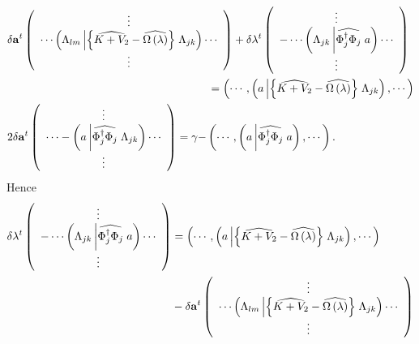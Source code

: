 \documentclass[aps,preprint]{revtex4}%
\begin{document}
\begin{align}
&  \delta\mathbf{a}^{t}\left(
\begin{array}
[c]{c}%
\vdots\\
\cdots\left(  \Lambda_{lm}\left\vert \left\{  \widehat{K+V_{2}}-\widehat
{\Omega\left(  \lambda\right)  }\right\}  \right.  \Lambda_{jk}\right)
\cdots\\
\vdots
\end{array}
\right)  +\delta\mathbf{\lambda}^{t}\left(
\begin{array}
[c]{c}%
\vdots\\
-\cdots\left(  \Lambda_{jk}\left\vert \widehat{\Phi_{j}^{\dagger}\Phi_{j}%
}\right.  a\right)  \cdots\\
\vdots
\end{array}
\right) \nonumber\\
&  \qquad\qquad\qquad\qquad\qquad\qquad\qquad\qquad\qquad\left.  =\right.
\left(  \cdots,\left(  a\left\vert \left\{  \widehat{K+V_{2}}-\widehat
{\Omega\left(  \lambda\right)  }\right\}  \right.  \Lambda_{jk}\right)
,\cdots\right) \nonumber\\
&  2\delta\mathbf{a}^{t}\left(
\begin{array}
[c]{c}%
\vdots\\
\cdots-\left(  a\left\vert \widehat{\Phi_{j}^{\dagger}\Phi_{j}}\right.
\Lambda_{jk}\right)  \cdots\\
\vdots
\end{array}
\right)  =\mathbf{\gamma-}\left(  \cdots,\left(  a\left\vert \widehat{\Phi
_{j}^{\dagger}\Phi_{j}}\right.  a\right)  ,\cdots\right)  \mathbf{.}%
\end{align}
Hence
\begin{align}
\delta\mathbf{\lambda}^{t}\left(
\begin{array}
[c]{c}%
\vdots\\
-\cdots\left(  \Lambda_{jk}\left\vert \widehat{\Phi_{j}^{\dagger}\Phi_{j}%
}\right.  a\right)  \cdots\\
\vdots
\end{array}
\right)   &  =\left(  \cdots,\left(  a\left\vert \left\{  \widehat{K+V_{2}%
}-\widehat{\Omega\left(  \lambda\right)  }\right\}  \right.  \Lambda
_{jk}\right)  ,\cdots\right) \nonumber\\
&  -\delta\mathbf{a}^{t}\left(
\begin{array}
[c]{c}%
\vdots\\
\cdots\left(  \Lambda_{lm}\left\vert \left\{  \widehat{K+V_{2}}-\widehat
{\Omega\left(  \lambda\right)  }\right\}  \right.  \Lambda_{jk}\right)
\cdots\\
\vdots
\end{array}
\right)
\end{align}
\end{document}
